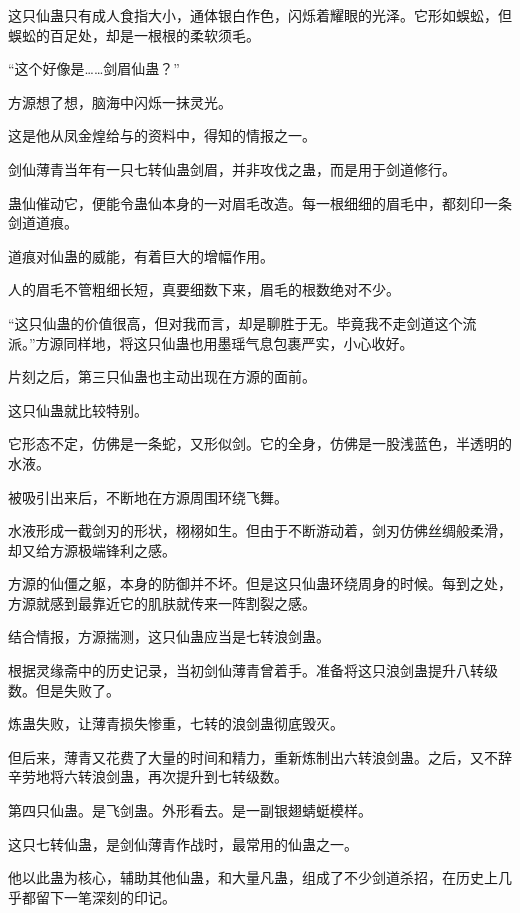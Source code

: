 
\begin{this_body}

这只仙蛊只有成人食指大小，通体银白作色，闪烁着耀眼的光泽。它形如蜈蚣，但蜈蚣的百足处，却是一根根的柔软须毛。

“这个好像是……剑眉仙蛊？”

方源想了想，脑海中闪烁一抹灵光。

这是他从凤金煌给与的资料中，得知的情报之一。

剑仙薄青当年有一只七转仙蛊剑眉，并非攻伐之蛊，而是用于剑道修行。

蛊仙催动它，便能令蛊仙本身的一对眉毛改造。每一根细细的眉毛中，都刻印一条剑道道痕。

道痕对仙蛊的威能，有着巨大的增幅作用。

人的眉毛不管粗细长短，真要细数下来，眉毛的根数绝对不少。

“这只仙蛊的价值很高，但对我而言，却是聊胜于无。毕竟我不走剑道这个流派。”方源同样地，将这只仙蛊也用墨瑶气息包裹严实，小心收好。

片刻之后，第三只仙蛊也主动出现在方源的面前。

这只仙蛊就比较特别。

它形态不定，仿佛是一条蛇，又形似剑。它的全身，仿佛是一股浅蓝色，半透明的水液。

被吸引出来后，不断地在方源周围环绕飞舞。

水液形成一截剑刃的形状，栩栩如生。但由于不断游动着，剑刃仿佛丝绸般柔滑，却又给方源极端锋利之感。

方源的仙僵之躯，本身的防御并不坏。但是这只仙蛊环绕周身的时候。每到之处，方源就感到最靠近它的肌肤就传来一阵割裂之感。

结合情报，方源揣测，这只仙蛊应当是七转浪剑蛊。

根据灵缘斋中的历史记录，当初剑仙薄青曾着手。准备将这只浪剑蛊提升八转级数。但是失败了。

炼蛊失败，让薄青损失惨重，七转的浪剑蛊彻底毁灭。

但后来，薄青又花费了大量的时间和精力，重新炼制出六转浪剑蛊。之后，又不辞辛劳地将六转浪剑蛊，再次提升到七转级数。

第四只仙蛊。是飞剑蛊。外形看去。是一副银翅蜻蜓模样。

这只七转仙蛊，是剑仙薄青作战时，最常用的仙蛊之一。

他以此蛊为核心，辅助其他仙蛊，和大量凡蛊，组成了不少剑道杀招，在历史上几乎都留下一笔深刻的印记。


\end{this_body}

